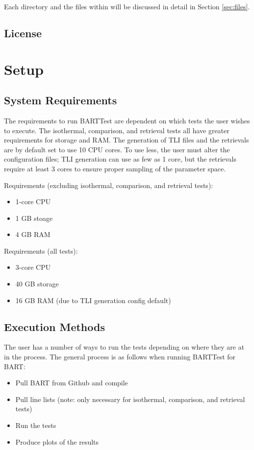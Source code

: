 \documentclass[letterpaper, 12pt]{article}
\begin{document}
Each directory and the files within will be discussed in detail in 
Section \ref{sec:files}.

\pagebreak
\subsection{License}
\label{sec:license}

\section{Setup}
\label{sec:setup}

\subsection{System Requirements}
The requirements to run BARTTest are dependent on which tests the user wishes 
to execute. The isothermal, comparison, and retrieval tests all have greater 
requirements for storage and RAM. The generation of TLI files and the 
retrievals are by default set to use 10 CPU cores. To use less, the user must 
alter the configuration files; TLI generation can use as few as 1 core, but 
the retrievals require at least 3 cores to ensure proper sampling of the 
parameter space.

Requirements (excluding isothermal, comparison, and retrieval tests):
\begin{itemize} \itemsep0pt
  \item 1-core CPU
  \item 1 GB stoage
  \item 4 GB RAM
\end{itemize}

Requirements (all tests):
\begin{itemize} \itemsep0pt
  \item 3-core CPU
  \item 40 GB storage
  \item 16 GB RAM (due to TLI generation config default)
\end{itemize}

\subsection{Execution Methods}
\label{sec:commands}
The user has a number of ways to run the tests depending on where they are at 
in the process. The general process is as follows when running BARTTest for 
BART:
\begin{itemize} \itemsep0pt
  \item Pull BART from Github and compile
  \item Pull line lists (note: only necessary for 
        isothermal, comparison, and retrieval tests)
  \item Run the tests
  \item Produce plots of the results
\end{itemize}
\end{document}
